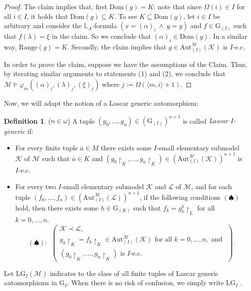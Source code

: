 \documentclass[11pt]{article}
\theoremstyle{plain}
\theoremstyle{definition}
\newtheorem{dfn}{Definition}
\newcommand{\M}{\mathcal{M}}
\newcommand{\K}{\mathcal{K}}
\newcommand{\G}{\mathrm{G}}
\newcommand{\A}{\mathrm{Aut}}
\newcommand{\Aa}{\A_{(I)}^{\M}(\K)}
\newcommand{\LG}{\mathrm{LG}}
\begin{document}
\begin{proof}
The claim implies that, first $\mathrm{Dom}(g)=K$:  note that since $\Omega(i)\in I$ for all $i\in I$, it holds that $\mathrm{Dom}(g)\subseteq K $. To see $K\subseteq \mathrm{Dom}(g)$, let $i\in I$ be arbitrary and consider  the $\mathbb{L}_{A}$-formula $(x=(\alpha)_{i} \ \wedge \ y=y)$ and $f\in\G_{(I)} $ such that $f(\lambda)=\xi$ in the claim. So we conclude that $(\alpha)_{i}\in \mathrm{Dom}(g)$. In a similar way, $\mathrm{Range}(g)=K$. Secondly, the claim implies that $g\in\Aa$ is $I$-e.c.
	
	In order to prove the claim, suppose we have the assumptions of the Claim. Thus, by iterating similar arguments to statements (1) and (2), we conclude that $\M\models\varphi_{m}((\alpha)_{i},(\lambda)_{j},(\xi)_{j})$ where $j:=\Omega(\langle m,i\rangle+1)$.
\end{proof}
Now, we will adapt the notion of a Lascar generic automorphism:	
\begin{dfn}
($n\in\omega$)	A tuple  $ (g_{0},...,g_{n})\in(\G_{(I)})^{n+1} $ is called \textit{Lascar $I$-generic} if:
	\begin{itemize}
		\item[(i)] For every finite tuple $ \bar{a}\in M $ there exists some $I$-small elementary submodel $ \K $ of $\M$ such that $ \bar{a}\in K $ and $ (g_{0}\upharpoonright_{K},...,g_{n}\upharpoonright_{K})\in(\Aa)^{n+1}  $ is $I$-e.c.
		\item[(ii)] For every two $I$-small elementary submodel $ \K$ and $ \mathcal{L}$ of $\M$, and for each tuple $ (f_{0},...,f_{n})\in(\A_{(I)}^{\M}(\mathcal{L}))^{n+1} $, if  the following conditions $(\spadesuit)$ hold, then there exists some $ h\in\G_{(K)} $ such that  $ f_{k}=g_{k}^{h}\upharpoonright_{L} $ for all $k=0,...,n$.
		$$(\spadesuit): \ \ \left(\begin{array}{c}
		 \K\prec\mathcal{L},\\
		 {g_{k}\upharpoonright_{K}=f_{k}\upharpoonright_{K}\in\Aa }   \text{ for all } k=0,...,n,  \text{ and }	\\
		(g_{0}\upharpoonright_{K},...,g_{n}\upharpoonright_{K})  \text{ is } I\text{-e.c.}
		\end{array}\right).$$
	\end{itemize}
Let $ \LG_{I}(\M) $ indicates to the class of all finite tuples of Lascar generic automorphisms in $ \G_{I} $. When there is no risk of confusion, we simply write $ \LG_{I} $ .
\end{dfn}
\end{document}
